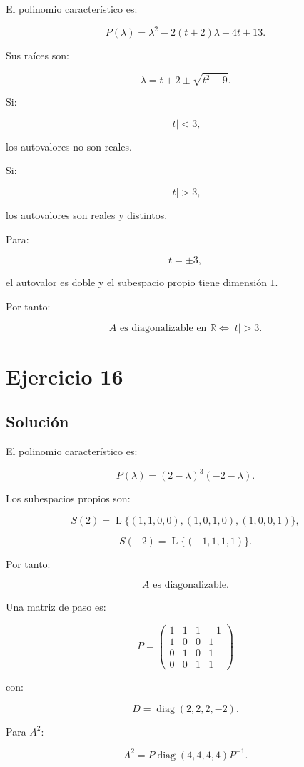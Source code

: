 \documentclass[11pt,a4paper]{article}
\newcommand{\R}{\mathbb{R}}
\newcommand{\diag}{\operatorname{diag}}
\newcommand{\Span}{\operatorname{L}}
\begin{document}
El polinomio característico es:

\[
P(\lambda)
=
\lambda^2-2(t+2)\lambda+4t+13.
\]

Sus raíces son:

\[
\lambda=t+2\pm\sqrt{t^2-9}.
\]

Si:

\[
|t|<3,
\]

los autovalores no son reales.

Si:

\[
|t|>3,
\]

los autovalores son reales y distintos.

Para:

\[
t=\pm3,
\]

el autovalor es doble y el subespacio propio tiene dimensión $1$.

Por tanto:

\[
\boxed{
A\text{ es diagonalizable en }\R
\iff
|t|>3.
}
\]

\section{Ejercicio 16}
\subsection{Solución}

El polinomio característico es:

\[
P(\lambda)
=
(2-\lambda)^3(-2-\lambda).
\]

Los subespacios propios son:

\[
S(2)
=
\Span\{
(1,1,0,0),
(1,0,1,0),
(1,0,0,1)
\},
\]

\[
S(-2)
=
\Span\{(-1,1,1,1)\}.
\]

Por tanto:

\[
\boxed{
A\text{ es diagonalizable.}
}
\]

Una matriz de paso es:

\[
\boxed{
P=
\begin{pmatrix}
1&1&1&-1\\
1&0&0&1\\
0&1&0&1\\
0&0&1&1
\end{pmatrix}
}
\]

con:

\[
\boxed{
D=
\diag(2,2,2,-2).
}
\]

Para $A^2$:

\[
\boxed{
A^2
=
P\diag(4,4,4,4)P^{-1}.
}
\]
\end{document}
